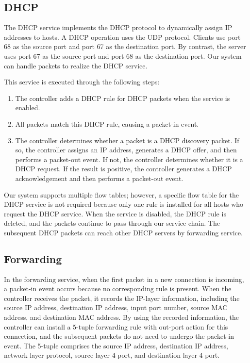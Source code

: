 \subsection{DHCP}
The DHCP service implements the DHCP protocol to dynamically assign IP addresses to hosts. A DHCP operation uses the UDP protocol. Clients use port 68 as the source port and port 67 as the destination port. By contrast, the server uses port 67 as the source port and port 68 as the destination port. Our system can handle packets to realize the DHCP service.

This service is executed through the following steps:
\begin{enumerate}
\item The controller adds a DHCP rule for DHCP packets when the service is enabled.
\item All packets match this DHCP rule, causing a packet-in event.
\item The controller determines whether a packet is a DHCP discovery packet. If so, the controller assigns an IP address, generates a DHCP offer, and then performs a packet-out event. If not, the controller determines whether it is a DHCP request. If the result is positive, the controller generates a DHCP acknowledgement and then performs a packet-out event.
\end{enumerate}

Our system supports multiple flow tables; however, a specific flow table for the DHCP service is not required because only one rule is installed for all hosts who request the DHCP service. When the service is disabled, the DHCP rule is deleted, and the packets continue to pass through our service chain. The subsequent DHCP packets can reach other DHCP servers by forwarding service.


\subsection{Forwarding} \label{ssec:forwarding}
In the forwarding service, when the first packet in a new connection is incoming, a packet-in event occurs because no corresponding rule is present. When the controller receives the packet, it records the IP-layer information, including the source IP address, destination IP address, input port number, source MAC address, and destination MAC address. By using the recorded information, the controller can install a 5-tuple forwarding rule with out-port action for this connection, and the subsequent packets do not need to undergo the packet-in event. The 5-tuple comprises the source IP address, destination IP address, network layer protocol, source layer 4 port, and destination layer 4 port.

